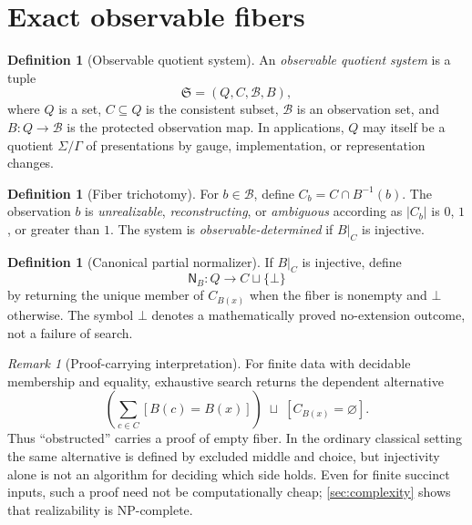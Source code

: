 \documentclass[11pt]{article}
\theoremstyle{definition}
\newtheorem{definition}[theorem]{Definition}
\theoremstyle{remark}
\newtheorem{remark}[theorem]{Remark}
\numberwithin{equation}{section}
\newcommand{\cB}{\mathcal B}
\begin{document}
\section{Exact observable fibers}\label{sec:exact}

\begin{definition}[Observable quotient system]
An \emph{observable quotient system} is a tuple
\[
 \mathfrak S=(Q,C,\cB,B),
\]
where $Q$ is a set, $C\subseteq Q$ is the consistent subset, $\cB$ is an observation set, and $B:Q\to\cB$ is the protected observation map.  In applications, $Q$ may itself be a quotient $\Sigma/\Gamma$ of presentations by gauge, implementation, or representation changes.
\end{definition}

\begin{definition}[Fiber trichotomy]
For $b\in\cB$, define $C_b=C\cap B^{-1}(b)$.  The observation $b$ is \emph{unrealizable}, \emph{reconstructing}, or \emph{ambiguous} according as $|C_b|$ is $0$, $1$, or greater than $1$.  The system is \emph{observable-determined} if $B|_C$ is injective.
\end{definition}

\begin{definition}[Canonical partial normalizer]
If $B|_C$ is injective, define
\[
 \mathsf N_B:Q\longrightarrow C\sqcup\{\bot\}
\]
by returning the unique member of $C_{B(x)}$ when the fiber is nonempty and $\bot$ otherwise.  The symbol $\bot$ denotes a mathematically proved no-extension outcome, not a failure of search.
\end{definition}

\begin{remark}[Proof-carrying interpretation]
For finite data with decidable membership and equality, exhaustive search
returns the dependent alternative
\[
 \left(\sum_{c\in C} [B(c)=B(x)]\right)
 \;\sqcup\;
 [C_{B(x)}=\varnothing].
\]
Thus \enquote{obstructed} carries a proof of empty fiber.  In the ordinary
classical setting the same alternative is defined by excluded middle and
choice, but injectivity alone is not an algorithm for deciding which side
holds.  Even for finite succinct inputs, such a proof need not be
computationally cheap; \cref{sec:complexity} shows that realizability is
NP-complete.
\end{remark}
\end{document}
